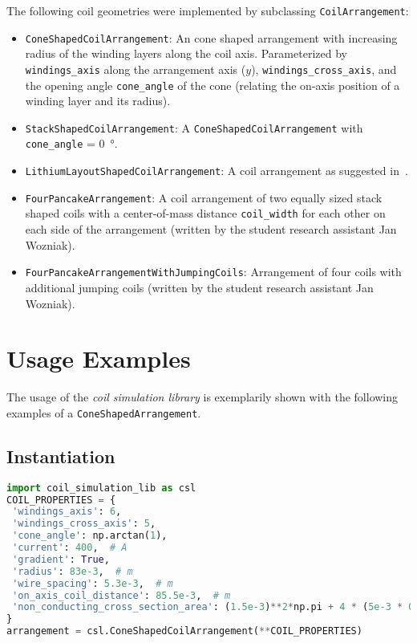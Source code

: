 The following coil geometries were implemented by subclassing \texttt{CoilArrangement}:
\begin{itemize}
    \item \texttt{ConeShapedCoilArrangement}: An cone shaped arrangement with increasing radius of the winding layers along the coil axis. Parameterized by \texttt{windings\_axis} along the arrangement axis ($y$), \texttt{windings\_cross\_axis}, and the opening angle \texttt{cone\_angle} of the cone (relating the on-axis position of a winding layer and its radius).
    \item \texttt{StackShapedCoilArrangement}: A \texttt{ConeShapedCoilArrangement} with \texttt{cone\_angle} = \SI[]{0}{\degree}.
    \item \texttt{LithiumLayoutShapedCoilArrangement}: A coil arrangement as suggested in~\cite{gantner_magnetic_2012}.
    \item \texttt{FourPancakeArrangement}: A coil arrangement of two equally sized stack shaped coils with a center-of-mass distance \texttt{coil\_width} for each other on each side of the arrangement (written by the student research assistant Jan Wozniak).
    \item \texttt{FourPancakeArrangementWithJumpingCoils}: Arrangement of four coils with additional jumping coils (written by the student research assistant Jan Wozniak).
\end{itemize}


\section*{Usage Examples}
The usage of the \textit{coil simulation library} is exemplarily shown with the following examples of a \texttt{ConeShapedArrangement}.

\subsection*{Instantiation}
\begin{lstlisting}[language=Python]
import coil_simulation_lib as csl
COIL_PROPERTIES = {
 'windings_axis': 6,
 'windings_cross_axis': 5,
 'cone_angle': np.arctan(1),
 'current': 400,  # A
 'gradient': True,
 'radius': 83e-3,  # m
 'wire_spacing': 5.3e-3,  # m
 'on_axis_coil_distance': 85.5e-3,  # m
 'non_conducting_cross_section_area': (1.5e-3)**2*np.pi + 4 * (5e-3 * 0.15e-3)  # m^2
}
arrangement = csl.ConeShapedCoilArrangement(**COIL_PROPERTIES)
\end{lstlisting}

